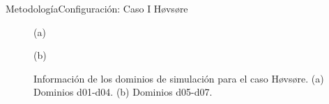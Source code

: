 \documentclass[mathserif,10pt]{beamer}
\begin{document}
\begin{frame}{Metodología}{Configuración: Caso I Høvsøre}
	\begin{figure}[H]
		\centering
		\begin{minipage}{0.5\linewidth}
			\center(a)
		\end{minipage}%
		\begin{minipage}{0.5\linewidth}
			\center(b)
		\end{minipage}%
		
		\hspace{0.5cm}%
		\vspace{0.3cm}%
		
		\caption{Información de los dominios de simulación para el caso Høvsøre. (a) Dominios d01-d04. (b) Dominios d05-d07.}
		\label{fig:05_dom_hov_a}
	\end{figure}
\end{frame}
\end{document}
